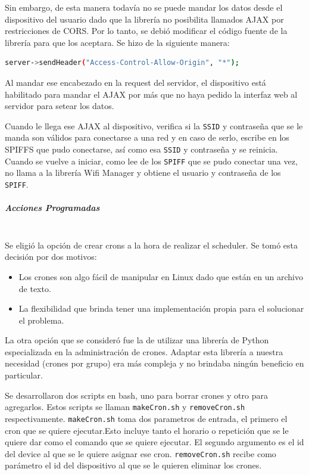 Sin embargo, de esta manera todavía no se puede mandar los datos desde el dispositivo del usuario dado que la librería no posibilita llamados AJAX por restricciones de CORS. Por lo tanto, se debió modificar el código fuente de la librería para que los aceptara. Se hizo de la siguiente manera:

\begin{lstlisting}[language=bash]
server->sendHeader("Access-Control-Allow-Origin", "*");
\end{lstlisting}


Al mandar ese encabezado en la request del servidor, el dispositivo está habilitado para mandar el AJAX por más que no haya pedido la interfaz web al servidor para setear los datos.

Cuando le llega ese AJAX al dispositivo, verifica si la \lstinline[columns=fixed]{SSID} y contraseña que se le manda son válidos para conectarse a una red y en caso de serlo, escribe en los SPIFFS que pudo conectarse, así como esa  \lstinline[columns=fixed]{SSID} y contraseña y  se reinicia. Cuando se vuelve a iniciar, como lee de los \lstinline[columns=fixed]{SPIFF} que se pudo conectar una vez, no llama a la librería Wifi Manager y obtiene el usuario y contraseña de los \lstinline[columns=fixed]{SPIFF}.



\subparagraph{Acciones Programadas}\mbox{}\\

Se eligió la opción de crear crons a la hora de realizar el scheduler. Se tomó esta decisión por dos motivos: 
\begin{itemize}
  \item Los crones son algo fácil de manipular en Linux dado que están en un archivo de texto.
  \item La flexibilidad que brinda tener una implementación propia para el solucionar el problema.
\end{itemize}

La otra opción que se consideró fue la de utilizar una librería de Python especializada en la administración de crones. Adaptar esta librería a nuestra necesidad (crones por grupo) era más compleja y no brindaba ningún beneficio en particular.

Se desarrollaron dos scripts en bash, uno para borrar crones y otro para agregarlos. Estos scripts se llaman \lstinline[columns=fixed]{makeCron.sh} y \lstinline[columns=fixed]{removeCron.sh} respectivamente.
\lstinline[columns=fixed]{makeCron.sh} toma dos parametros de entrada, el primero el cron que se quiere ejecutar.Esto incluye tanto el horario o repetición que se le quiere dar como el comando que se quiere ejecutar. El segundo argumento es el id del device al que se le quiere asignar ese cron. 
\lstinline[columns=fixed]{removeCron.sh} recibe como parámetro el id del dispositivo al que se le quieren eliminar los crones.

